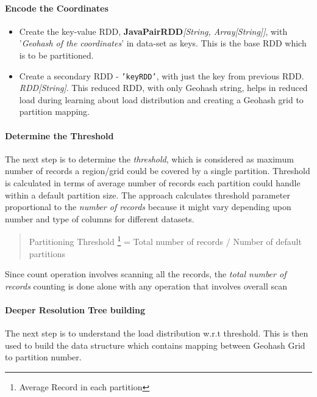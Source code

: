 \documentclass[article,type=msc,colorback,12pt,accentcolor=tud1d]{tudthesis}
\begin{document}
			\paragraph{Encode the Coordinates}
				\begin{itemize}
					\item Create the key-value RDD, \textbf{JavaPairRDD}\textit{[String, Array[String]]}, with '\textit{Geohash of the coordinates}' in data-set as keys. This is the base RDD which is to be partitioned.
					\item Create a secondary RDD - \texttt{'keyRDD'}, with just the key from previous RDD. \textit{RDD[String]}. This reduced RDD, with only Geohash string, helps in reduced load during learning about load distribution and creating a Geohash grid to partition mapping. 
				\end{itemize}
			\paragraph{Determine the Threshold}
				The next step is to determine the \textit{threshold}, which is considered as maximum number of records a region/grid could be covered by a single partition. Threshold is calculated in terms of average number of records each partition could handle within a default partition size. The approach calculates threshold parameter proportional to the \textit{ number of records} because it might vary depending upon number and type of columns for different datasets.
				
				
				\begin{quote} Partitioning Threshold \footnote{Average Record in each partition}  = Total number  of records / Number of default partitions
				\end{quote}
				
				Since count operation involves scanning all the records, the \textit{total number of records} counting is done alone with any operation that involves overall scan
			
			\paragraph{Deeper Resolution Tree building}
				The next step is to understand the load distribution w.r.t threshold. This is then used to build the data structure which contains mapping between Geohash Grid to partition number.
				
\end{document}
